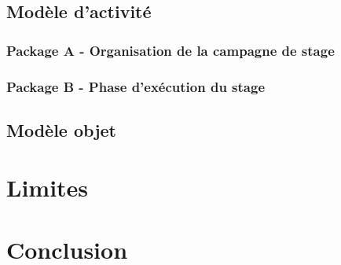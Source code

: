 \documentclass[12pt,a4paper]{article}
\begin{document}
\subsection{Modèle d'activité}

\subsubsection{Package A - Organisation de la campagne de stage}

\newpage {} 

\restoregeometry {} \newpage

\subsubsection{Package B - Phase d'exécution du stage}

\newpage {} 

\restoregeometry {} \newpage

\subsection{Modèle objet}

\section{Limites}

\section{Conclusion}
\end{document}
